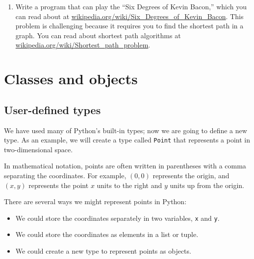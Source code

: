 \documentclass[10pt]{book}
\begin{document}
\begin{ex}
\begin{enumerate}

\item Write a program that can play the ``Six Degrees of Kevin
  Bacon,'' which you can read about at
  \url{wikipedia.org/wiki/Six_Degrees_of_Kevin_Bacon}.  This
problem is challenging because it requires you to find the shortest
path in a graph.  You can read about shortest path algorithms
at \url{wikipedia.org/wiki/Shortest_path_problem}.

\end{enumerate}

\end{ex}


\chapter{Classes and objects}


\section{User-defined types}
\label{point}


We have used many of Python's built-in types; now we are going
to define a new type.  As an example, we will create a type
called {\tt Point} that represents a point in two-dimensional
space.


In mathematical notation, points are often written in
parentheses with a comma separating the coordinates. For example,
$(0, 0)$ represents the origin, and $(x, y)$ represents the
point $x$ units to the right and $y$ units up from the origin.

There are several ways we might represent points in Python:

\begin{itemize}

\item We could store the coordinates separately in two
variables, {\tt x} and {\tt y}.

\item We could store the coordinates as elements in a list
or tuple.

\item We could create a new type to represent points as
objects.

\end{itemize}
\end{document}
